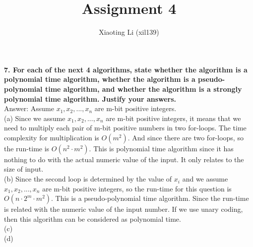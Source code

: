 \documentclass{article}
\title{Assignment 4}
\author{Xiaoting Li (xil139)}
\date{}
\begin{document}
\maketitle

\noindent
\textbf{7. For each of the next 4 algorithms, state whether the algorithm is a polynomial time algorithm, whether the algorithm is a pseudo-polynomial time algorithm, and whether the algorithm is a strongly polynomial time algorithm. Justify your answers.} \\ \newline
Answer: Assume $x_1, x_2, ..., x_n$ are m-bit positive integers. \\
(a) Since we assume $x_1, x_2, ..., x_n$ are m-bit positive integers, it means that we need to multiply each pair of m-bit positive numbers in two for-loops. The time complexity for multiplication is $O(m^{2})$. And since there are two for-loops, so the run-time is $O(n^{2}\cdot m{^2})$. This is polynomial time algorithm since it has nothing to do with the actual numeric value of the input. It only relates to the size of input.\\
(b) Since the second loop is determined by the value of $x_i$ and we assume $x_1, x_2, ..., x_n$ are m-bit positive integers, so the run-time for this question is $O(n\cdot 2^{m}\cdot m{^2})$. This is a pseudo-polynomial time algorithm. Since the run-time is related with the numeric value of the input number. If we use unary coding, then this algorithm can be considered as polynomial time. \\
(c) \\
(d) \\ \newline

\noindent
\textbf{}
\end{document}
